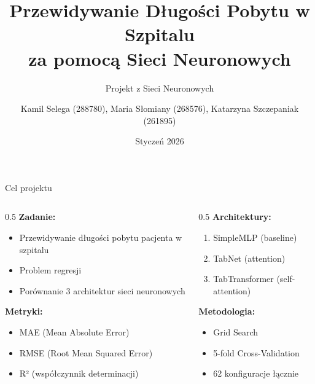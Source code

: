 \documentclass[aspectratio=169,12pt]{beamer}
\title{Przewidywanie Długości Pobytu w Szpitalu\\za pomocą Sieci Neuronowych}
\subtitle{Projekt z Sieci Neuronowych}
\author{Kamil Selega (288780), Maria Słomiany (268576), Katarzyna Szczepaniak (261895)}
\institute{Wydział Informatyki i Telekomunikacji, Politechnika Wrocławska}
\date{Styczeń 2026}
\begin{document}
\begin{frame}[plain]
    \titlepage
\end{frame}

\begin{frame}{Cel projektu}
    \begin{columns}[T]
        \begin{column}{0.5\textwidth}
            \textbf{Zadanie:}
            \begin{itemize}
                \item Przewidywanie długości pobytu pacjenta w szpitalu
                \item Problem regresji
                \item Porównanie 3 architektur sieci neuronowych
            \end{itemize}
            \vspace{0.5cm}
            \textbf{Metryki:}
            \begin{itemize}
                \item MAE (Mean Absolute Error)
                \item RMSE (Root Mean Squared Error)
                \item R² (współczynnik determinacji)
            \end{itemize}
        \end{column}
        \begin{column}{0.5\textwidth}
            \textbf{Architektury:}
            \begin{enumerate}
                \item SimpleMLP (baseline)
                \item TabNet (attention)
                \item TabTransformer (self-attention)
            \end{enumerate}
            \vspace{0.5cm}
            \textbf{Metodologia:}
            \begin{itemize}
                \item Grid Search
                \item 5-fold Cross-Validation
                \item 62 konfiguracje łącznie
            \end{itemize}
        \end{column}
    \end{columns}
\end{frame}
\end{document}
